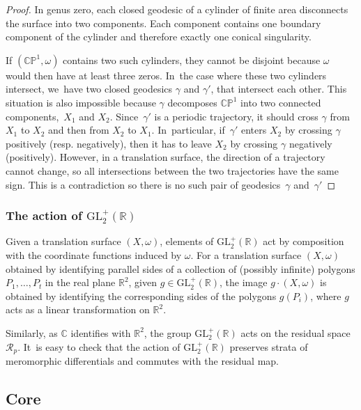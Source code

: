 \documentclass[11pt]{article}
\newcommand{\resp}{resp.\xspace}
\theoremstyle{definition}
\begin{document}
\begin{proof}
In genus zero, each closed geodesic of a cylinder of finite area disconnects the surface into two components. Each component contains one boundary component of the cylinder and therefore exactly one conical singularity.

If $(\mathbb{CP}^{1},\omega)$ contains two such cylinders, they cannot be disjoint because $\omega$ would then have at least three zeros. In~the case where these two cylinders intersect, we~have two closed geodesics $\gamma$ and $\gamma'$, that intersect each other. This situation is also impossible because $\gamma$ decomposes $\mathbb{CP}^{1}$ into two connected components,~$X_{1}$ and $X_{2}$. Since~$\gamma'$ is a periodic trajectory, it should cross $\gamma$ from $X_{1}$ to $X_{2}$ and then from $X_{2}$ to $X_{1}$. In~particular, if~$\gamma'$ enters $X_{2}$ by crossing $\gamma$ positively (\resp negatively), then it has to leave $X_{2}$ by crossing $\gamma$ negatively (positively). However, in a translation surface, the direction of a trajectory cannot change, so all intersections between the two trajectories have the same sign. This is a contradiction so there is no such pair of geodesics~$\gamma$ and~$\gamma'$
\end{proof}

\subsubsection{The action of $\mathrm{GL}_{2}^{+}(\mathbb{R})$}\label{subsub:action}

Given a translation surface $(X,\omega)$, elements of $\mathrm{GL}_{2}^{+}(\mathbb{R})$ act by composition with the coordinate functions induced by $\omega$. For a translation surface $(X,\omega)$ obtained by identifying parallel sides of a collection of (possibly infinite) polygons $P_{1},\dots,P_{t}$ in the real plane $\mathbb{R}^{2}$, given $g\in \mathrm{GL}_{2}^{+}(\mathbb{R})$, the image $g\cdot(X,\omega)$ is obtained by identifying the corresponding sides of the polygons $g(P_i)$, where $g$ acts as a linear transformation on $\mathbb{R}^{2}$.

Similarly, as $\mathbb{C}$ identifies with $\mathbb{R}^{2}$, the group $\mathrm{GL}_{2}^{+}(\mathbb{R})$ acts on the residual space~$\mathcal{R}_p$. It~is easy to check that the action of $\mathrm{GL}_{2}^{+}(\mathbb{R})$ preserves strata of meromorphic differentials and commutes with the residual map.

\subsection{Core}\label{sub:core}
\end{document}
